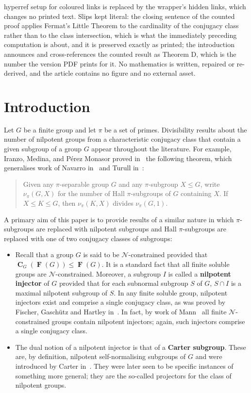 \documentclass[10pt,a4paper]{amsart}
\numberwithin{equation}{section}
\DeclareMathOperator{\fitt}{\mathbf{F}}
\DeclareMathOperator{\cent}{\mathbf{C}}
\renewcommand{\leq}{\leqslant}
\begin{document}
hyperref setup for coloured links is replaced by the wrapper's hidden links, which changes no printed text. Slips kept literal: the closing sentence of the counted proof applies Fermat's Little Theorem to the cardinality of the conjugacy class rather than to the class intersection, which is what the immediately preceding computation is about, and it is preserved exactly as printed; the introduction announces and cross-references the counted result as Theorem D, which is the number the version PDF prints for it. No mathematics is written, repaired or re-derived, and the article contains no figure and no external asset.

\section{Introduction} 

Let $G$ be a finite group and let $\pi$ be a set of primes. Divisibility results about the number of nilpotent groups 
from a characteristic conjugacy class that contain a given subgroup of a group $G$ appear throughout the literature.  
For example, Iranzo, Medina, and P\'erez Monasor proved in~\cite{arithmetical_questions} the following theorem, 
which generalises work of Navarro in~\cite{Navarro} and Turull in~\cite{Turull}:
\begin{quote}
Given any $\pi$-separable group $G$ and any $\pi$-subgroup $X \leq G$, 
write $\nu_\pi(G,X)$ for the number of Hall $\pi$-subgroups of $G$ containing $X$. 
If $X \leq K \leq G$, then $\nu_\pi(K,X)$ divides $\nu_\pi(G,1)$.
\end{quote}


A primary aim of this paper is to provide results of a similar nature in which $\pi$-subgroups are replaced with nilpotent subgroups 
and Hall $\pi$-subgroups are replaced with one of two conjugacy classes of subgroups:
\begin{itemize}
\item Recall that a group $G$ is said to be $\mathcal{N}$-constrained
provided that $\cent_G(\fitt(G)) \leq \fitt(G)$. 
It is a standard fact that all finite soluble groups are $\mathcal{N}$-constrained.
Moreover, a subgroup $I$ is called a \textbf{nilpotent injector} of $G$
provided that for each subnormal subgroup $S$ of $G$,
$S \cap I$ is a maximal nilpotent subgroup of $S$.  In any finite soluble group,
nilpotent injectors exist and comprise a single conjugacy class,
as was proved by Fischer, Gasch\"{u}tz and Hartley in~\cite{injectoren}.
In fact, by work of Mann~\cite{mann_injectors} 
all finite $\mathcal{N}$-constrained groups contain nilpotent injectors; 
again, such injectors comprise a single conjugacy class. 


\item The dual notion of a nilpotent injector is that of a \textbf{Carter subgroup}. 
These are, by definition, nilpotent self-normalising subgroups of $G$ and  were
introduced by Carter in~\cite{Carter}. 
They were later seen to be  specific instances of something more general;
they are the so-called projectors for the class of nilpotent groups.
\end{itemize}
\end{document}
